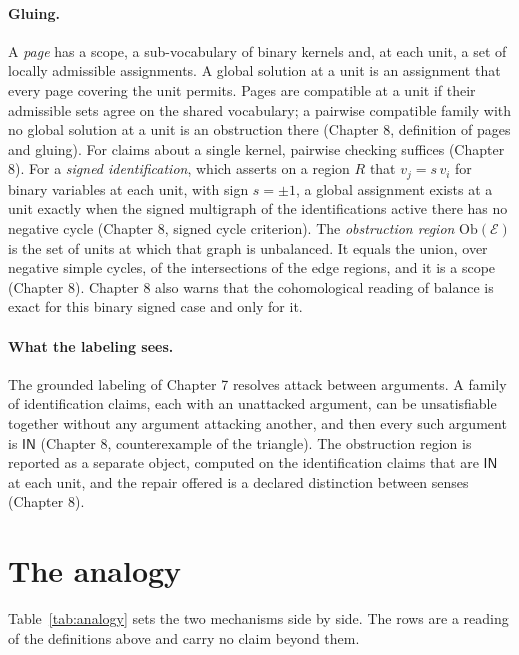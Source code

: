 \documentclass[11pt]{article}
\theoremstyle{plain}
\theoremstyle{definition}
\theoremstyle{remark}
\newcommand{\Ob}{\mathrm{Ob}}
\newcommand{\IN}{\textsf{IN}}
\begin{document}
\paragraph{Gluing.} A \emph{page} has a scope, a sub-vocabulary of binary kernels and, at each unit, a set of locally admissible assignments. A global solution at a unit is an assignment that every page covering the unit permits. Pages are compatible at a unit if their admissible sets agree on the shared vocabulary; a pairwise compatible family with no global solution at a unit is an obstruction there (Chapter 8, definition of pages and gluing). For claims about a single kernel, pairwise checking suffices (Chapter 8). For a \emph{signed identification}, which asserts on a region $R$ that $v_j=s\,v_i$ for binary variables at each unit, with sign $s=\pm1$, a global assignment exists at a unit exactly when the signed multigraph of the identifications active there has no negative cycle (Chapter 8, signed cycle criterion). The \emph{obstruction region} $\Ob(\mathcal E)$ is the set of units at which that graph is unbalanced. It equals the union, over negative simple cycles, of the intersections of the edge regions, and it is a scope (Chapter 8). Chapter 8 also warns that the cohomological reading of balance is exact for this binary signed case and only for it.

\paragraph{What the labeling sees.} The grounded labeling of Chapter 7 resolves attack between arguments. A family of identification claims, each with an unattacked argument, can be unsatisfiable together without any argument attacking another, and then every such argument is $\IN$ (Chapter 8, counterexample of the triangle). The obstruction region is reported as a separate object, computed on the identification claims that are $\IN$ at each unit, and the repair offered is a declared distinction between senses (Chapter 8).

\section{The analogy}\label{sec:analogy}

Table~\ref{tab:analogy} sets the two mechanisms side by side. The rows are a reading of the definitions above and carry no claim beyond them.
\end{document}

